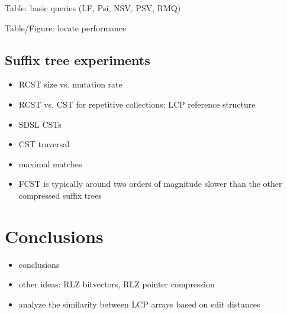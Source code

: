 \documentclass[a4paper,11pt]{llncs}
\newcommand{\FCST}{\textsf{FCST}}
\begin{document}
Table: basic queries (LF, Psi, NSV, PSV, RMQ)

Table/Figure: locate performance

\subsection{Suffix tree experiments}

\begin{itemize}
\item RCST size vs. mutation rate
\item RCST vs. CST for repetitive collections; LCP reference structure
\item SDSL CSTs
\item CST traversal
\item maximal matches
\item \FCST{} is typically around two orders of magnitude slower than the other compressed suffix trees \cite{Abeliuk2013}
\end{itemize}


\section{Conclusions}\label{section:conclusions}

\begin{itemize}
\item conclusions
\item other ideas: RLZ bitvectors, RLZ pointer compression
\item analyze the similarity between LCP arrays based on edit distances
\end{itemize}




\end{document}
